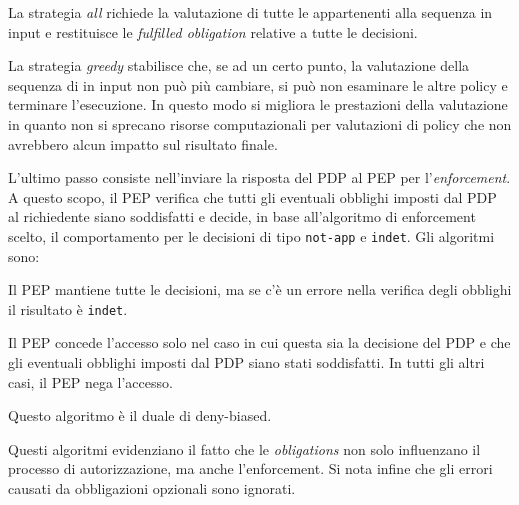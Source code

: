 \begin{description}[labelindent=5pt,style=multiline,leftmargin=3cm]
  \item[All]La strategia \emph{all} richiede la valutazione di tutte le \epolicy appartenenti alla sequenza in input e
            restituisce le \emph{fulfilled obligation} relative a tutte le decisioni.
  \item[Greedy]La strategia \emph{greedy} stabilisce che, se ad un certo punto, la valutazione della sequenza di \epolicy
               in input non può più cambiare, si può non esaminare le altre policy e terminare l'esecuzione. In questo modo
               si migliora le prestazioni della valutazione in quanto non si sprecano risorse computazionali
               per valutazioni di policy che non avrebbero alcun impatto sul risultato finale.
\end{description}\par
L'ultimo passo consiste nell'inviare la risposta del \ac{PDP} al \ac{PEP} per l'\emph{enforcement}. A questo scopo, il \ac{PEP} verifica
che tutti gli eventuali obblighi imposti dal \ac{PDP} al richiedente siano soddisfatti e decide, in base all'algoritmo di
enforcement scelto, il comportamento per le decisioni di tipo \texttt{not-app} e \texttt{indet}. Gli algoritmi sono:
\begin{description}[labelindent=5pt,style=multiline,leftmargin=4cm]
  \item[base]Il \ac{PEP} mantiene tutte le decisioni, ma se c'è un errore nella verifica degli obblighi il risultato è \texttt{indet}.
  \item[deny-biased]Il \ac{PEP} concede l'accesso solo nel caso in cui questa sia la decisione del \ac{PDP} e che gli eventuali obblighi imposti dal \ac{PDP} siano stati soddisfatti. In tutti gli altri casi, il \ac{PEP} nega l’accesso.
  \item[permit-biased]
  Questo algoritmo è il duale di deny-biased.
\end{description}
Questi algoritmi evidenziano il fatto che le \emph{obligations} non solo influenzano il processo di autorizzazione, ma anche l'enforcement.
Si nota infine che gli errori causati da obbligazioni opzionali sono ignorati.



